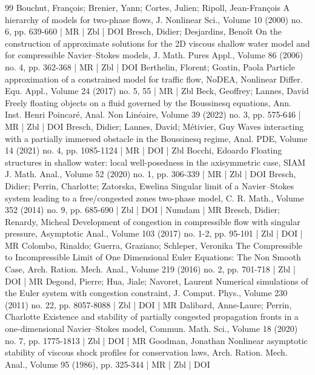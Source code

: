 \begin{thebibliography}{99}
 Bouchut, François; Brenier, Yann; Cortes, Julien; Ripoll, Jean-François A hierarchy of models for two-phase flows, J. Nonlinear Sci., Volume 10 (2000) no. 6, pp. 639-660 | MR | Zbl | DOI
 Bresch, Didier; Desjardins, Benoît On the construction of approximate solutions for the 2D viscous shallow water model and for compressible Navier–Stokes models, J. Math. Pures Appl., Volume 86 (2006) no. 4, pp. 362-368 | MR | Zbl | DOI
 Berthelin, Florent; Goatin, Paola Particle approximation of a constrained model for traffic flow, NoDEA, Nonlinear Differ. Equ. Appl., Volume 24 (2017) no. 5, 55 | MR | Zbl
 Beck, Geoffrey; Lannes, David Freely floating objects on a fluid governed by the Boussinesq equations, Ann. Inst. Henri Poincaré, Anal. Non Linéaire, Volume 39 (2022) no. 3, pp. 575-646 | MR | Zbl | DOI
 Bresch, Didier; Lannes, David; Métivier, Guy Waves interacting with a partially immersed obstacle in the Boussinesq regime, Anal. PDE, Volume 14 (2021) no. 4, pp. 1085-1124 | MR | DOI | Zbl
 Bocchi, Edoardo Floating structures in shallow water: local well-posedness in the axisymmetric case, SIAM J. Math. Anal., Volume 52 (2020) no. 1, pp. 306-339 | MR | Zbl | DOI
 Bresch, Didier; Perrin, Charlotte; Zatorska, Ewelina Singular limit of a Navier–Stokes system leading to a free/congested zones two-phase model, C. R. Math., Volume 352 (2014) no. 9, pp. 685-690 | Zbl | DOI | Numdam | MR
 Bresch, Didier; Renardy, Micheal Development of congestion in compressible flow with singular pressure, Asymptotic Anal., Volume 103 (2017) no. 1-2, pp. 95-101 | Zbl | DOI | MR
 Colombo, Rinaldo; Guerra, Graziano; Schleper, Veronika The Compressible to Incompressible Limit of One Dimensional Euler Equations: The Non Smooth Case, Arch. Ration. Mech. Anal., Volume 219 (2016) no. 2, pp. 701-718 | Zbl | DOI | MR
 Degond, Pierre; Hua, Jiale; Navoret, Laurent Numerical simulations of the Euler system with congestion constraint, J. Comput. Phys., Volume 230 (2011) no. 22, pp. 8057-8088 | Zbl | DOI | MR
 Dalibard, Anne-Laure; Perrin, Charlotte Existence and stability of partially congested propagation fronts in a one-dimensional Navier–Stokes model, Commun. Math. Sci., Volume 18 (2020) no. 7, pp. 1775-1813 | Zbl | DOI | MR
 Goodman, Jonathan Nonlinear asymptotic stability of viscous shock profiles for conservation laws, Arch. Ration. Mech. Anal., Volume 95 (1986), pp. 325-344 | MR | Zbl | DOI

\end{thebibliography}
